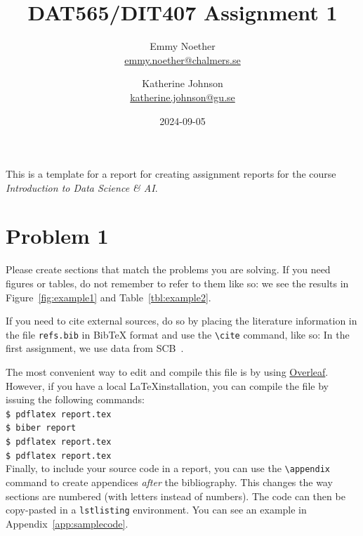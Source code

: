 \documentclass[a4paper]{article}
\begin{document}
\author{
  Emmy Noether \\
  \href{mailto:emmy.noether@chalmers.se}{emmy.noether@chalmers.se}
  \and
  Katherine Johnson \\
  \href{mailto:katherine.johnson@gu.se}{katherine.johnson@gu.se}
}
\title{DAT565/DIT407 Assignment 1}
\date{2024-09-05}

\maketitle

This is a template for a report for creating assignment reports for
the course \emph{Introduction to Data Science \& AI}.

\section*{Problem 1}

Please create sections that match the problems you are solving. If you
need figures or tables, do not remember to refer to them like so: we
see the results in Figure~\ref{fig:example1} and
Table~\ref{tbl:example2}.

If you need to cite external sources, do so by placing the literature
information in the file \texttt{refs.bib} in BibTeX format and use the
\texttt{\textbackslash{}cite} command, like so: In the first
assignment, we use data from SCB~\cite{SCB:2023}.

The most convenient way to edit and compile this file is by using
\href{https://www.overleaf.com}{Overleaf}. However, if you have a
local \LaTeX installation, you can compile the file by issuing the
following commands:\\
\texttt{\$ pdflatex report.tex} \\
\texttt{\$ biber report} \\
\texttt{\$ pdflatex report.tex} \\
\texttt{\$ pdflatex report.tex} \\


Finally, to include your source code in a report, you can use the
\texttt{\textbackslash{}appendix} command to create appendices
\emph{after} the bibliography. This changes the way sections are
numbered (with letters instead of numbers). The code can then be
copy-pasted in a \texttt{lstlisting} environment. You can see an
example in Appendix~\ref{app:samplecode}.
\end{document}
